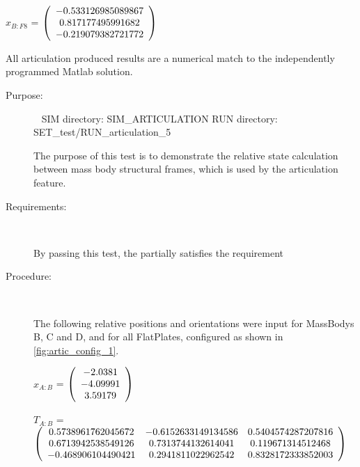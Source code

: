 \begin{description}
$\hat{x}_{B:F8}$  = $\left( \begin{array} {ccc} -0.533126985089867 \\ 0.817177495991682 \\ -0.219079382721772
\end{array} \right)\\ \\$

All \ModelDesc articulation produced results are a numerical match to the
independently programmed Matlab solution.


\end{description}

\label{test:art_test_5}

\begin{description}

\item[Purpose:] \ \newline
SIM directory: SIM\_ARTICULATION
RUN directory: SET\_test/RUN\_articulation\_5

The purpose of this test is to demonstrate the relative state calculation
between mass body structural frames, which is used by the articulation
feature.

\item[Requirements:] \ \newline

By passing this test, the \ModelDesc partially satisfies
the requirement 

\item[Procedure:] \ \newline

The following relative positions and orientations were input for MassBodys
B, C and D, and for all FlatPlates, configured as shown in
\ref{fig:artic_config_1}.

$x_{A:B}$ = $\left( \begin{array} {ccc}    -2.0381 \\   -4.09991 \\    3.59179
\end{array} \right)\\ \\$

$T_{A:B}$ = $\left( \begin{array} {ccc}
   0.5738961762045672 & -0.6152633149134586 & 0.5404574287207816 \\
   0.6713942538549126 & 0.7313744132614041 & 0.119671314512468 \\
   -0.468906104490421 & 0.2941811022962542 & 0.8328172333852003 \\
\end{array} \right)\\ \\$


\end{description}
